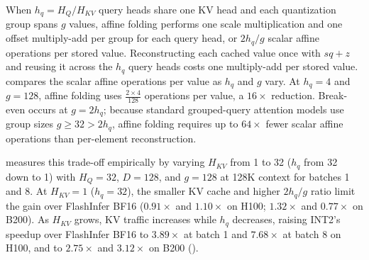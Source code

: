 When $h_q=H_Q/H_{KV}$ query heads share one KV head and each quantization group spans $g$ values, affine folding performs one scale multiplication and one offset multiply-add per group for each query head, or $2h_q/g$ scalar affine operations per stored value.
Reconstructing each cached value once with $sq+z$ and reusing it across the $h_q$ query heads costs one multiply-add per stored value.
 compares the scalar affine operations per value as $h_q$ and $g$ vary.
At $h_q=4$ and $g=128$, affine folding uses $\frac{2 \times 4}{128}$ operations per value, a $16\times$ reduction.
Break-even occurs at $g=2h_q$; because standard grouped-query attention models use group sizes $g \ge 32 > 2h_q$, affine folding requires up to $64\times$ fewer scalar affine operations than per-element reconstruction.

 measures this trade-off empirically by varying $H_{KV}$ from 1 to 32 ($h_q$ from 32 down to 1) with $H_Q=32$, $D=128$, and $g=128$ at 128K context for batches 1 and 8.
At $H_{KV}=1$ ($h_q=32$), the smaller KV cache and higher $2h_q/g$ ratio limit the gain over FlashInfer BF16 ($0.91\times$ and $1.10\times$ on H100; $1.32\times$ and $0.77\times$ on B200).
As $H_{KV}$ grows, KV traffic increases while $h_q$ decreases, raising \sys{} INT2's speedup over FlashInfer BF16 to $3.89\times$ at batch 1 and $7.68\times$ at batch 8 on H100, and to $2.75\times$ and $3.12\times$ on B200 ().

\clearpage
